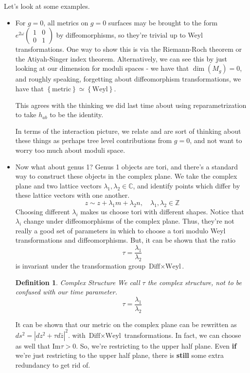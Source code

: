 \documentclass[11pt, oneside]{article}   	%
\theoremstyle{slanted}
\newtheorem*{defn}{Definition}
\begin{document}
Let's look at some examples.
\begin{itemize}
	\item For $ g  = 0 $, all metrics on $ g  =0 $ surfaces 
	may be brought to the form $ e ^{ 2 \omega } \begin{pmatrix}  1 & 0 \\ 0 & 1  \end{pmatrix}  $ 
	by diffeomorphisms, so they're trivial 
	up to Weyl transformations. One way 
	to show this is via the Riemann-Roch theorem or 
	the Atiyah-Singer index theorem. 
	Alternatively, we can see this by just looking 
	at our dimension for moduli spaces - we have that $ \dim \left( M_  g  \right)   =0 $, 
	and roughly speaking, forgetting about diffeomorphism transformations, 
	we have that $ \left\{ \text{metric} \right\} \simeq \left\{ \text{Weyl} \right\}  $. 

	
	This agrees with the thinking we did last time about 
	using reparametrization to take $ h _{ ab } $ to be the identity.

	In terms of the interaction picture, we relate and are
	sort of thinking about these things 
	as perhaps tree level contributions from $ g  =0 $, 
	and not want to worry too much about moduli space. 

\item Now what about genus  1? Genus 1 objects are tori, 
	and there's a standard way to construct these objects 
	in the complex plane. We take the complex plane 
	and two lattice vectors $ \lambda_ 1 , \lambda _ 2 \in \mathbb{ C } $, 
	and identify points which differ by these lattice vectors 
	with one another.
	\[
		z \sim z + \lambda _1 m + \lambda _2 n , \quad \lambda _ 1, \lambda _ 2 
		\in \mathbb{ Z}
\] Choosing different $ \lambda _ i $ makes us choose 
tori with different shapes. Notice that $ \lambda _ i $ 
change under diffeomorphisms of the complex plane. Thus, they're
not really a good set of parameters in which to choose 
a tori modulo Weyl transformations and diffeomorphisms. 
But, it can be shown that the ratio 
\[
 \tau  = \frac{\lambda _ 1 }{ \lambda _ 2 } 
\] is invariant under the transformation group $\text{Diff}\times\text{Weyl}$.

\begin{defn}{Complex Structure}
	We call $ \tau $ the complex structure, 
	not to be confused with our time parameter. 
	\[
	 \tau  = \frac{\lambda _ 1  }{ \lambda _ 2 } 
	\] 
\end{defn}
It can be shown that our 
metric on the complex plane can be rewritten as 
$ ds^ 2 = |dz^ 2 + \tau d \overline{ z } | ^ 2 	$. 
with $ \text{Diff} \times \text{Weyl}$ transformations. In fact, 
we can choose as well that  $ \text{Im} \tau > 0 $. 
So, we're restricting to the upper half plane. 
Even \textbf{if} we're just restricting to the upper half plane, 
there is \textbf{still} some extra redundancy to get rid of. 



\end{itemize}
\end{document}
